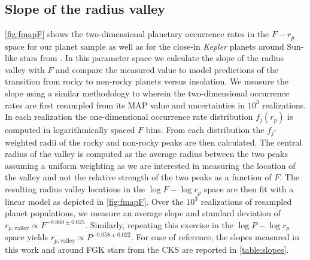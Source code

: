 \documentclass[twocolumn]{emulateapj}
\newcommand{\kepler}[1]{\emph{Kepler}#1}
\begin{document}
\subsection{Slope of the radius valley}
\autoref{fig:fmapF} shows the two-dimensional planetary occurrence rates in the $F-r_p$ space for
our planet sample as well as for the close-in \kepler{} planets around Sun-like stars
from \cite{martinez19}.
In this parameter space we calculate the slope of the radius valley with $F$ and compare the measured
value to model predictions of the transition from rocky to non-rocky planets
versus insolation. We measure the slope using a similar methodology to \cite{martinez19} wherein
the two-dimensional occurrence rates are first resampled from its MAP value and uncertainties in
$10^3$ realizations. In each realization the
one-dimensional occurrence rate distribution $f_j(r_p)$ is computed in logarithmically spaced $F$
bins. From each distribution the $f_j$-weighted radii of the rocky and non-rocky peaks are then calculated.
The central radius of the valley is computed as the average radius between the two peaks
assuming a uniform weighting as we are interested in measuring the location of the valley and not the relative
strength of the two peaks as a function of $F$. The resulting radius valley locations in the $\log{F}-\log{r_p}$
space are then fit with a linear model as depicted in \autoref{fig:fmapF}. 
Over the $10^3$ realizations of resampled planet
populations, we measure an average slope and standard deviation of
$r_{p,\text{valley}} \propto F^{-0.060\pm 0.025}$. Similarly, repeating this exercise in the $\log{P}-\log{r_p}$
space yields $r_{p,\text{valley}} \propto P^{-0.058\pm 0.022}$. For ease of reference, the slopes measured
in this work and around FGK stars from the CKS \citep{martinez19} are reported in \autoref{table:slopes}.


\end{document}
